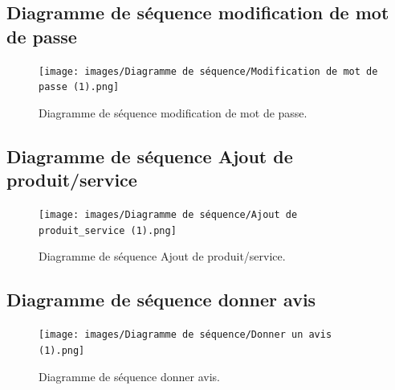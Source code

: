 \subsection{Diagramme de séquence modification de mot de passe }
\begin{figure}[H]
    \centering
    \texttt{[image: images/Diagramme de séquence/Modification de mot de passe (1).png]}
    \caption{Diagramme de séquence modification de mot de passe.}
    \label{fig:my_label}
\end{figure}

\subsection{Diagramme de séquence Ajout de produit/service }
\begin{figure}[H]
    \centering
    \texttt{[image: images/Diagramme de séquence/Ajout de produit\_service (1).png]}
    \caption{Diagramme de séquence Ajout de produit/service.}
    \label{fig:my_label}
\end{figure}

\subsection{Diagramme de séquence donner avis }
\begin{figure}[H]
    \centering
    \texttt{[image: images/Diagramme de séquence/Donner un avis (1).png]}
    \caption{Diagramme de séquence donner avis.}
    \label{fig:my_label}
\end{figure}